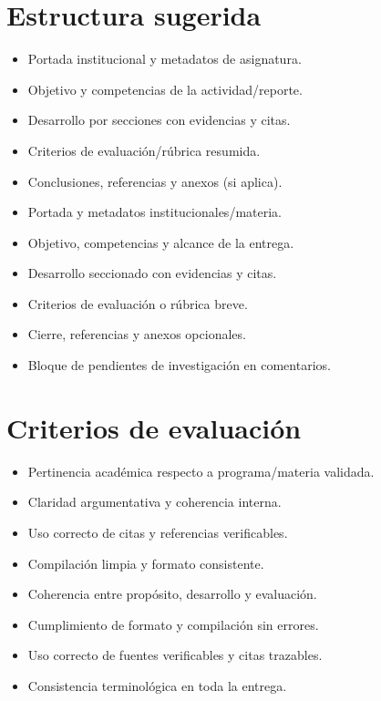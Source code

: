 \documentclass[12pt]{article}
\begin{document}
\section*{Estructura sugerida}
\begin{itemize}[leftmargin=*]
  \item Portada institucional y metadatos de asignatura.
  \item Objetivo y competencias de la actividad/reporte.
  \item Desarrollo por secciones con evidencias y citas.
  \item Criterios de evaluación/rúbrica resumida.
  \item Conclusiones, referencias y anexos (si aplica).
  \item Portada y metadatos institucionales/materia.
  \item Objetivo, competencias y alcance de la entrega.
  \item Desarrollo seccionado con evidencias y citas.
  \item Criterios de evaluación o rúbrica breve.
  \item Cierre, referencias y anexos opcionales.
  \item Bloque de pendientes de investigación en comentarios.
\end{itemize}

\section*{Criterios de evaluación}
\begin{itemize}[leftmargin=*]
  \item Pertinencia académica respecto a programa/materia validada.
  \item Claridad argumentativa y coherencia interna.
  \item Uso correcto de citas y referencias verificables.
  \item Compilación limpia y formato consistente.
  \item Coherencia entre propósito, desarrollo y evaluación.
  \item Cumplimiento de formato y compilación sin errores.
  \item Uso correcto de fuentes verificables y citas trazables.
  \item Consistencia terminológica en toda la entrega.
\end{itemize}
\end{document}
